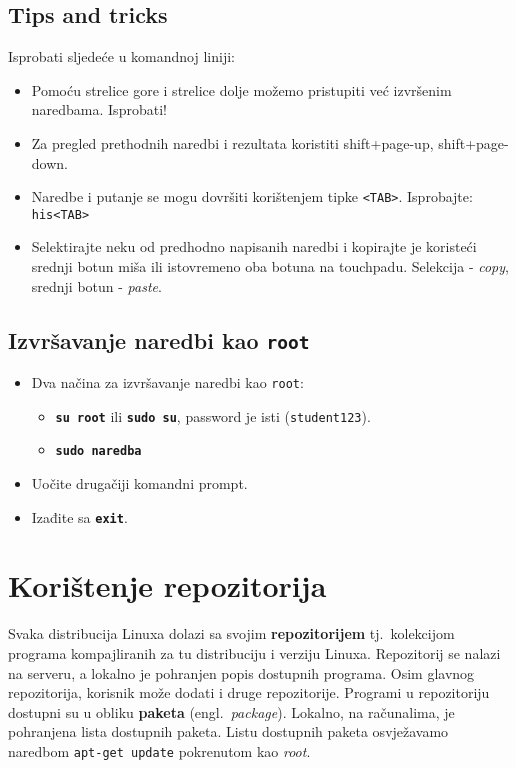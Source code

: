 \subsection*{Tips and tricks}
\begin{zadatak}
Isprobati sljedeće u komandnoj liniji:
\begin{itemize}
 \item Pomoću strelice gore i strelice dolje možemo pristupiti već izvršenim naredbama. Isprobati!
\item Za pregled prethodnih naredbi i rezultata koristiti shift+page-up, shift+page-down.
\item Naredbe i putanje se mogu dovršiti korištenjem tipke \texttt{<TAB>}. Isprobajte: \texttt{his<TAB>}
\item Selektirajte neku od predhodno napisanih naredbi i kopirajte je koristeći srednji botun miša ili istovremeno oba botuna na touchpadu. Selekcija - \textit{copy}, srednji botun - \textit{paste}.
\end{itemize}
\end{zadatak}
\subsection*{Izvršavanje naredbi kao \texttt{root}}
\begin{itemize}
 \item Dva načina za izvršavanje naredbi kao \texttt{root}: \begin{itemize}
\item \textbf{\texttt{su root}} ili \textbf{\texttt{sudo su}}, password je isti (\texttt{student123}).
\item \textbf{\texttt{sudo naredba}} 
 \end{itemize}
\item Uočite drugačiji komandni prompt.
\item Izađite sa \textbf{\texttt{exit}}.
\end{itemize}
\section{Korištenje repozitorija}
Svaka distribucija Linuxa dolazi sa svojim \textbf{repozitorijem} tj.~kolekcijom programa kompajliranih za tu distribuciju i verziju Linuxa. Repozitorij se nalazi na serveru, a lokalno je pohranjen popis dostupnih programa. Osim glavnog repozitorija, korisnik može dodati i druge repozitorije. Programi u repozitoriju dostupni su u obliku \textbf{paketa} (engl.~\textit{package}). Lokalno, na računalima, je pohranjena lista dostupnih paketa. Listu dostupnih paketa osvježavamo naredbom \lstinline!apt-get update! pokrenutom kao \textit{root}. 

